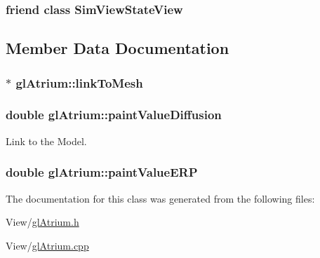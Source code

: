 \hypertarget{classgl_atrium_a3784e26d08f8db67d4187df43944ad76}{
\subsubsection[{Sim\+View\+State\+View}]{\setlength{\rightskip}{0pt plus 5cm}friend class {\bf Sim\+View\+State\+View}\hspace{0.3cm}{\ttfamily [friend]}}}\label{classgl_atrium_a3784e26d08f8db67d4187df43944ad76}


\subsection{Member Data Documentation}
\hypertarget{classgl_atrium_a8ded24946b8c91b4e1fb7f4f0545a6b0}{
\subsubsection[{link\+To\+Mesh}]{$\ast$ gl\+Atrium\+::link\+To\+Mesh}}\label{classgl_atrium_a8ded24946b8c91b4e1fb7f4f0545a6b0}
\hypertarget{classgl_atrium_a2dc7a9f9a09eeb04eee7fd51e2b6d889}{
\subsubsection[{paint\+Value\+Diffusion}]{\setlength{\rightskip}{0pt plus 5cm}double gl\+Atrium\+::paint\+Value\+Diffusion}}\label{classgl_atrium_a2dc7a9f9a09eeb04eee7fd51e2b6d889}


Link to the Model. 

\hypertarget{classgl_atrium_a501f9f86fd740a933a6e20efad9ff599}{
\subsubsection[{paint\+Value\+E\+R\+P}]{\setlength{\rightskip}{0pt plus 5cm}double gl\+Atrium\+::paint\+Value\+E\+R\+P}}\label{classgl_atrium_a501f9f86fd740a933a6e20efad9ff599}


The documentation for this class was generated from the following files\+:\begin{DoxyCompactItemize}
\item 
View/\hyperlink{gl_atrium_8h}{gl\+Atrium.\+h}\item 
View/\hyperlink{gl_atrium_8cpp}{gl\+Atrium.\+cpp}\end{DoxyCompactItemize}
